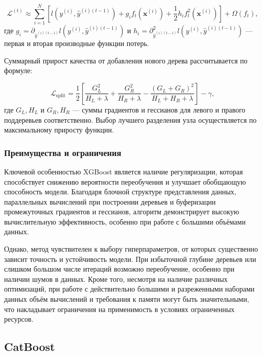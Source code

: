 \begin{equation}
\mathcal{L}^{(t)} \approx \sum_{i=1}^N \left[ l(y^{(i)}, \hat{y}^{(i)(t-1)}) + g_i f_t(\mathbf{x}^{(i)}) + \frac{1}{2} h_i f_t^2(\mathbf{x}^{(i)}) \right] + \Omega(f_t),
\end{equation}
где $g_i = \partial_{\hat{y}^{(i)(t-1)}} l(y^{(i)}, \hat{y}^{(i)(t-1)})$ и $h_i = \partial^2_{\hat{y}^{(i)(t-1)}} l(y^{(i)}, \hat{y}^{(i)(t-1)})$ — первая и вторая производные функции потерь.

Суммарный прирост качества от добавления нового дерева рассчитывается по формуле:

\begin{equation}
\mathcal{L}_{\text{split}} = \frac{1}{2} \left[ \frac{G_L^2}{H_L + \lambda} + \frac{G_R^2}{H_R + \lambda} - \frac{(G_L + G_R)^2}{H_L + H_R + \lambda} \right] - \gamma,
\end{equation}
где $G_L, H_L$ и $G_R, H_R$ — суммы градиентов и гессианов для левого и правого поддеревьев соответственно. Выбор лучшего разделения узла осуществляется по максимальному приросту функции.

\subsubsection{Преимущества и ограничения}

Ключевой особенностью XGBoost является наличие регуляризации, которая способствует снижению вероятности переобучения и улучшает обобщающую способность модели. Благодаря блочной структуре представления данных, параллельных вычислений при построении деревьев и буферизации промежуточных градиентов и гессианов, алгоритм демонстрирует высокую вычислительную эффективность, особенно при работе с большими объёмами данных.

Однако, метод чувствителен к выбору гиперпараметров, от которых существенно зависит точность и устойчивость модели. При избыточной глубине деревьев или слишком большом числе итераций возможно переобучение, особенно при наличии шумов в данных. Кроме того, несмотря на наличие различных оптимизаций, при работе с действительно большими и разреженными наборами данных объём вычислений и требования к памяти могут быть значительными, что накладывает ограничения на применимость в условиях ограниченных ресурсов.

\subsection{CatBoost}

